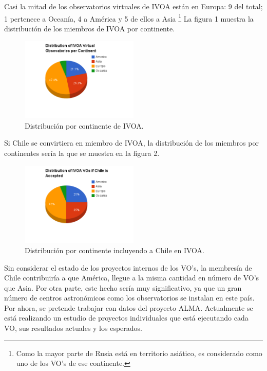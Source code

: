 Casi la mitad de los observatorios virtuales de IVOA están en Europa: 9 del
total; 1 pertenece a Oceanía, 4 a América y 5 de ellos a Asia \footnote{Como la
mayor parte de Rusia está en territorio asiático, es considerado como uno de
los VO's de ese continente.} La figura 1 muestra la distribución de los
miembros de IVOA por continente.
	\begin{figure}[h!t]
		\begin{center}
			\includegraphics[width=0.5\textwidth]{img/ivoa_vos_distribution.png}
			\caption{Distribución por continente de IVOA.}
		\end{center}
	\end{figure}

Si Chile se convirtiera en miembro de IVOA, la distribución de los miembros
por continentes sería la que se muestra en la figura 2.
	\begin{figure}[h!t]
		\begin{center}
			\includegraphics[width=0.5\textwidth]{img/if_chile_is_accepted.png}
			\caption{Distribución por continente incluyendo a Chile en IVOA.}
		\end{center}
	\end{figure}

Sin considerar el estado de los proyectos internos de los VO's, 
la membresía de Chile contribuiría a que América, llegue a la misma
cantidad en número de VO's que Asia. Por otra parte, este
hecho sería muy significativo, ya que un gran número de centros astronómicos
como los observatorios se instalan en este país. Por ahora, se pretende
trabajar con datos del proyecto ALMA. Actualmente se está realizando
un estudio de proyectos individuales que está ejecutando cada VO, sus resultados actuales
y los esperados.
